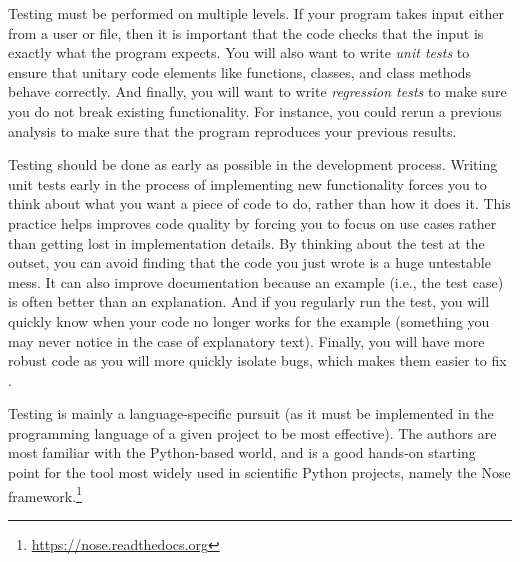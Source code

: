 \documentclass[ChapterTOCs,krantz2]{krantz} %
\begin{document}
Testing must be performed on multiple levels. If your program takes input
either from a user or file, then it is important that the code checks that the
input is exactly what the program expects. You will also want to write
\emph{unit tests} to ensure that unitary code elements like functions, classes,
and class methods behave correctly. And finally, you will want to write
\emph{regression tests} to make sure you do not break existing functionality.
For instance, you could rerun a previous analysis to make sure that the program
reproduces your previous results.

Testing should be done as early as possible in the development process.
Writing unit tests early in the process of implementing new functionality
forces you to think about what you want a piece of code to do, rather than how
it does it. This practice helps improves code quality by forcing you to focus
on use cases rather than getting lost in implementation details. By thinking
about the test at the outset, you can avoid finding that the code you just
wrote is a huge untestable mess. It can also improve documentation because an
example (i.e., the test case) is often better than an explanation. And if you
regularly run the test, you will quickly know when your code no longer works
for the example (something you may never notice in the case of explanatory
text). Finally, you will have more robust code as you will more quickly
isolate bugs, which makes them easier to fix \cite{oram2010making}.

Testing is mainly a language-specific pursuit (as it must be implemented in the
programming language of a given project to be most effective).  The authors are
most familiar with the Python-based world, and \cite{ctb-nose:2006} is a good
hands-on starting point for the tool most widely used in scientific Python
projects, namely the Nose
framework.\footnote{\url{https://nose.readthedocs.org}}

%
%
%
%
%
%
%
%
\end{document}
